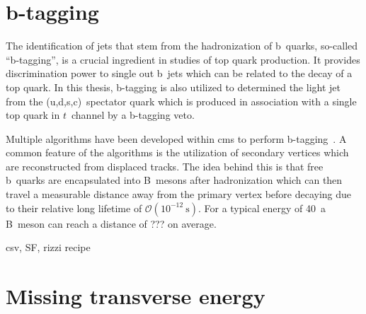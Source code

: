 \section{b-tagging}

The identification of jets that stem from the hadronization of b~quarks, so-called ``b-tagging'', is a crucial ingredient in studies of top quark production. It provides discrimination power to single out b~jets which can be related to the decay of a top quark. In this thesis, b-tagging is also utilized to determined the light jet from the (u,d,s,c)~spectator quark which is produced in association with a single top quark in $t$~channel by a b-tagging veto.

Multiple algorithms have been developed within \gls{cms} to perform b-tagging~\cite{Chatrchyan:2012jua,CMS-PAS-BTV-15-001}. A common feature of the algorithms is the utilization of secondary vertices which are reconstructed from displaced tracks. The idea behind this is that free b~quarks are encapsulated into  B~mesons after hadronization which can then travel a measurable distance away from the primary vertex before decaying due to their relative long lifetime of $\mathcal{O}(10^{-12}~\mathrm{s})$. For a typical energy of 40~\GeV a B~meson can reach a distance of ??? on average.


csv, SF, rizzi recipe

\section{Missing transverse energy}

